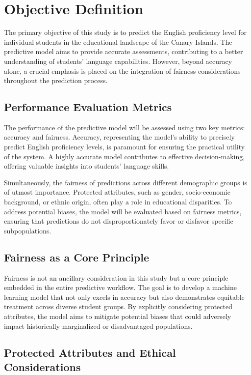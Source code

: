\documentclass[12pt,a4paper,openright,twoside]{book}
\begin{document}
\section{Objective Definition}

The primary objective of this study is to predict the English proficiency level for individual students in the educational landscape of the Canary Islands. The predictive model aims to provide accurate assessments, contributing to a better understanding of students' language capabilities. However, beyond accuracy alone, a crucial emphasis is placed on the integration of fairness considerations throughout the prediction process.

\subsection{Performance Evaluation Metrics}

The performance of the predictive model will be assessed using two key metrics: accuracy and fairness. Accuracy, representing the model's ability to precisely predict English proficiency levels, is paramount for ensuring the practical utility of the system. A highly accurate model contributes to effective decision-making, offering valuable insights into students' language skills.

Simultaneously, the fairness of predictions across different demographic groups is of utmost importance. Protected attributes, such as gender, socio-economic background, or ethnic origin, often play a role in educational disparities. To address potential biases, the model will be evaluated based on fairness metrics, ensuring that predictions do not disproportionately favor or disfavor specific subpopulations.

\subsection{Fairness as a Core Principle}

Fairness is not an ancillary consideration in this study but a core principle embedded in the entire predictive workflow. The goal is to develop a machine learning model that not only excels in accuracy but also demonstrates equitable treatment across diverse student groups. By explicitly considering protected attributes, the model aims to mitigate potential biases that could adversely impact historically marginalized or disadvantaged populations.

\subsection{Protected Attributes and Ethical Considerations}
\end{document}
